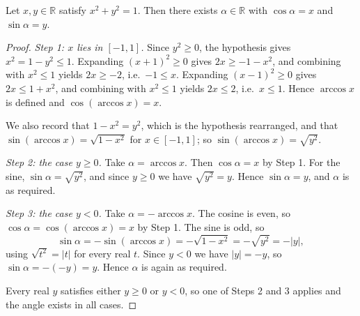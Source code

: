 \begin{lemma}
Let $x,y\in\mathbb{R}$ satisfy $x^2+y^2=1$. Then there exists
$\alpha\in\mathbb{R}$ with $\cos\alpha=x$ and $\sin\alpha=y$.
\end{lemma}
\begin{proof}
\emph{Step 1: $x$ lies in $[-1,1]$.} Since $y^2\ge 0$, the hypothesis gives
$x^2=1-y^2\le 1$. Expanding $(x+1)^2\ge 0$ gives $2x\ge -1-x^2$, and combining
with $x^2\le 1$ yields $2x\ge -2$, i.e.\ $-1\le x$. Expanding $(x-1)^2\ge 0$
gives $2x\le 1+x^2$, and combining with $x^2\le 1$ yields $2x\le 2$, i.e.\
$x\le 1$. Hence $\arccos x$ is defined and $\cos(\arccos x)=x$.

We also record that $1-x^2=y^2$, which is the hypothesis rearranged, and that
$\sin(\arccos x)=\sqrt{1-x^2}$ for $x\in[-1,1]$; so
$\sin(\arccos x)=\sqrt{y^2}$.

\emph{Step 2: the case $y\ge 0$.} Take $\alpha=\arccos x$. Then
$\cos\alpha=x$ by Step 1. For the sine, $\sin\alpha=\sqrt{y^2}$, and since
$y\ge 0$ we have $\sqrt{y^2}=y$. Hence $\sin\alpha=y$, and $\alpha$ is as
required.

\emph{Step 3: the case $y<0$.} Take $\alpha=-\arccos x$. The cosine is even, so
$\cos\alpha=\cos(\arccos x)=x$ by Step 1. The sine is odd, so
\[
  \sin\alpha=-\sin(\arccos x)=-\sqrt{1-x^2}=-\sqrt{y^2}=-\lvert y\rvert ,
\]
using $\sqrt{t^2}=\lvert t\rvert$ for every real $t$. Since $y<0$ we have
$\lvert y\rvert=-y$, so $\sin\alpha=-(-y)=y$. Hence $\alpha$ is again as
required.

Every real $y$ satisfies either $y\ge 0$ or $y<0$, so one of Steps 2 and 3
applies and the angle exists in all cases.
\end{proof}
